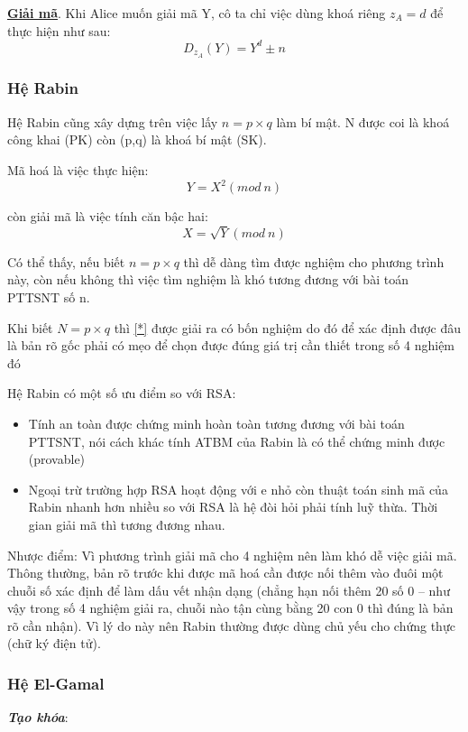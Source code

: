 \documentclass[a4paper,12pt]{report}
\begin{document}
\textbf{\underline{Giải mã}}. Khi Alice muốn giải mã Y, cô ta chỉ việc dùng khoá riêng $z_A = d$ để thực hiện như sau:
\begin{displaymath}
D_{z_A}(Y) = Y^d \pm n
\end{displaymath}
\subsubsection{Hệ Rabin}
Hệ Rabin cũng xây dựng trên việc lấy $n=p\times q$ làm bí mật. N được coi là khoá công khai (PK) còn (p,q) là khoá bí mật (SK).

Mã hoá là việc thực hiện:
\begin{displaymath}
Y = X^2 (mod \ n)
\end{displaymath}

còn giải mã là việc tính căn bậc hai:
\begin{equation}
X = \sqrt{Y} (mod \ n)  \label{*} 
\end{equation}

Có thể thấy, nếu biết $n=p\times q$ thì dễ dàng tìm được nghiệm cho phương trình này, còn nếu không thì việc tìm nghiệm là khó tương đương với bài toán PTTSNT số n.

Khi biết $N=p\times q$ thì \ref{*} được giải ra có bốn nghiệm do đó để xác định được đâu là bản rõ gốc phải có mẹo để chọn được đúng giá trị cần thiết trong số 4 nghiệm đó

Hệ Rabin có một số ưu điểm so với RSA:
\begin{itemize}
\item Tính an toàn được chứng minh hoàn toàn tương đương với bài toán PTTSNT, nói cách khác tính ATBM của Rabin là có thể chứng minh  được (provable)
\item Ngoại trừ trường hợp RSA hoạt động với e nhỏ còn thuật toán sinh mã của Rabin nhanh hơn nhiều so với RSA là hệ đòi hỏi phải tính luỹ thừa. Thời gian giải mã thì
tương đương nhau.
\end{itemize}

Nhược điểm: Vì phương trình giải mã cho 4 nghiệm nên làm khó dễ việc giải mã. Thông thường, bản rõ trước khi được mã hoá cần được nối thêm vào đuôi một chuỗi số xác định để làm dấu vết nhận dạng (chẳng hạn nối thêm 20 số 0 – như vậy trong số 4 nghiệm giải ra, chuỗi nào tận cùng bằng 20 con 0 thì đúng là bản rõ cần nhận). Vì lý do này nên Rabin thường được dùng chủ yếu cho chứng thực (chữ ký điện tử).

\subsubsection{Hệ El-Gamal}
\textbf{\textit{Tạo khóa}}:
\end{document}
